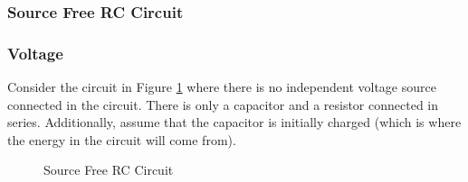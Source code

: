 \documentclass[12pt]{article}
\begin{document}
\subsubsection{Source Free RC Circuit}
\label{sssec:sourceFreeRCCircuit}

\subsubsection{Voltage}
\label{sssec:sfrccVoltage}

Consider the circuit in Figure \ref{fig:025} where there is no independent voltage source connected in the circuit. There is only a capacitor and a resistor connected in series. Additionally, assume that the capacitor is initially charged (which is where the energy in the circuit will come from).

\begin{figure}[H]
  \centering
  
  \caption{Source Free RC Circuit}
  \label{fig:025}
\end{figure}
\end{document}
